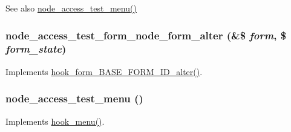 \begin{DoxySeeAlso}{See also}
\hyperlink{node__access__test_8module_a2dd99334135c118135fc170ea07f3d46}{node\_\-access\_\-test\_\-menu()} 
\end{DoxySeeAlso}
\hypertarget{node__access__test_8module_a22d192ecfb4b1cb2fd5533e6d2330636}{
\subsubsection[{node\_\-access\_\-test\_\-form\_\-node\_\-form\_\-alter}]{\setlength{\rightskip}{0pt plus 5cm}node\_\-access\_\-test\_\-form\_\-node\_\-form\_\-alter (\&\$ {\em form}, \/  \$ {\em form\_\-state})}}
\label{node__access__test_8module_a22d192ecfb4b1cb2fd5533e6d2330636}
Implements \hyperlink{group__hooks_gaf0cfc224a88c8823da68856c30a4841a}{hook\_\-form\_\-BASE\_\-FORM\_\-ID\_\-alter()}. \hypertarget{node__access__test_8module_a2dd99334135c118135fc170ea07f3d46}{
\subsubsection[{node\_\-access\_\-test\_\-menu}]{\setlength{\rightskip}{0pt plus 5cm}node\_\-access\_\-test\_\-menu ()}}
\label{node__access__test_8module_a2dd99334135c118135fc170ea07f3d46}
Implements \hyperlink{group__hooks_ga5c95244fea59b25666e409759e133ded}{hook\_\-menu()}.


